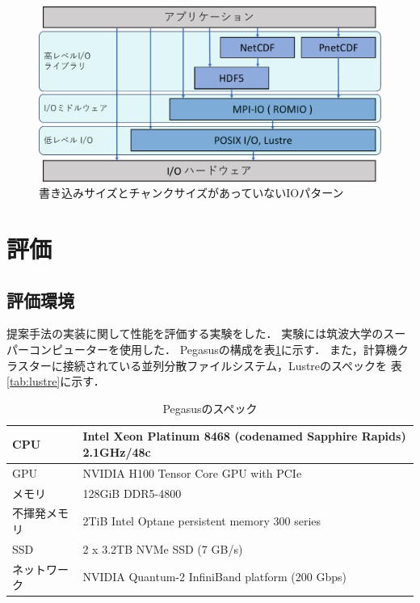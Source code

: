 \documentclass[submit,techrep,noauthor]{ipsj}
\begin{document}
\begin{figure}[tbp]
	\centering
	\includegraphics[page=12,width=\linewidth]{figure-crop.pdf}
	\caption{書き込みサイズとチャンクサイズがあっていないIOパターン}
	\label{fig:correctio}
\end{figure}

\section{評価}
\subsection{評価環境}
提案手法の実装に関して性能を評価する実験をした．
実験には筑波大学のスーパーコンピューター\cite{ccs2022pegasus}を使用した．
Pegasusの構成を表\ref{tab:pegasus}に示す．
また，計算機クラスターに接続されている並列分散ファイルシステム，Lustreのスペックを
表\ref{tab:lustre}に示す．

\begin{table}[tbp]
	\caption{Pegasusのスペック}
	\label{tab:pegasus}
	\centering
	
	\begin{tabular}{l||l}
		\hline
		CPU    & Intel Xeon Platinum 8468 (codenamed Sapphire Rapids) 2.1GHz/48c \\ \hline
		GPU    & NVIDIA H100 Tensor Core GPU with PCIe                           \\ \hline
		メモリ    & 128GiB DDR5-4800                                                \\ \hline
		不揮発メモリ & 2TiB Intel Optane persistent memory 300 series                  \\ \hline
		SSD    & 2 x 3.2TB NVMe SSD (7 GB/s)                                     \\ \hline
		ネットワーク & NVIDIA Quantum-2 InfiniBand platform (200 Gbps)                 \\ \hline
	\end{tabular}
\end{table}
\end{document}

